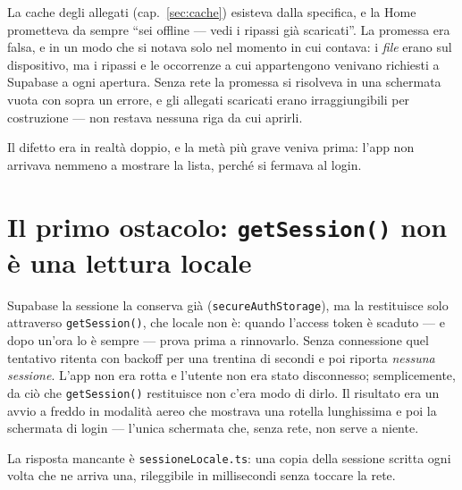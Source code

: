 \documentclass[11pt,a4paper]{report}
\begin{document}
La cache degli allegati (cap.~\ref{sec:cache}) esisteva dalla specifica, e la Home prometteva
da sempre ``sei offline --- vedi i ripassi gi\`a scaricati''. La promessa era
falsa, e in un modo che si notava solo nel momento in cui contava: i \emph{file}
erano sul dispositivo, ma i ripassi e le occorrenze a cui appartengono venivano
richiesti a Supabase a ogni apertura. Senza rete la promessa si risolveva in una
schermata vuota con sopra un errore, e gli allegati scaricati erano irraggiungibili
per costruzione --- non restava nessuna riga da cui aprirli.

Il difetto era in realt\`a doppio, e la met\`a pi\`u grave veniva prima: l'app
non arrivava nemmeno a mostrare la lista, perch\'e si fermava al login.

\section{Il primo ostacolo: \texttt{getSession()} non \`e una lettura locale}

Supabase la sessione la conserva gi\`a (\texttt{secureAuthStorage}), ma la
restituisce solo attraverso \texttt{getSession()}, che locale non \`e: quando
l'access token \`e scaduto --- e dopo un'ora lo \`e sempre --- prova prima a
rinnovarlo. Senza connessione quel tentativo ritenta con backoff per una
trentina di secondi e poi riporta \emph{nessuna sessione}. L'app non era rotta e
l'utente non era stato disconnesso; semplicemente, da ci\`o che
\texttt{getSession()} restituisce non c'era modo di dirlo. Il risultato era un
avvio a freddo in modalit\`a aereo che mostrava una rotella lunghissima e poi la
schermata di login --- l'unica schermata che, senza rete, non serve a niente.

La risposta mancante \`e \texttt{sessioneLocale.ts}: una copia della sessione
scritta ogni volta che ne arriva una, rileggibile in millisecondi senza toccare
la rete.
\end{document}
